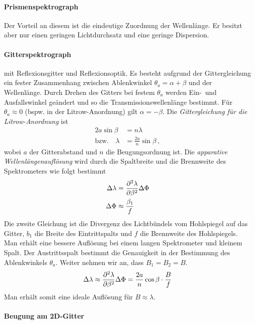 \paragraph{Prismenspektrograph}
Der Vorteil an diesem ist die eindeutige Zuordnung der Wellenlänge. 
Er besitzt aber nur einen geringen Lichtdurchsatz und eine geringe
Dispersion.

\paragraph{Gitterspektrograph}
mit Reflexionsgitter und Reflexionsoptik. 
Es besteht aufgrund der Gittergleichung ein fester Zusammenhang
zwischen Ablenkwinkel $\theta_a=\alpha+\beta$ und der Wellenlänge.
Durch Drehen des Gitters bei festem $\theta_a$
werden Ein-~und Ausfallswinkel geändert und so die
Transmissionswellenlänge bestimmt.
Für $\theta_a\approx 0$ (bspw. in der
Litrow-Anordnung) gilt $\alpha=-\beta$.
Die \emph{Gittergleichung für die Litrow-Anordnung}%
 ist
\begin{align*}
  2a\sin\beta &=n\lambda\\
  \text{bzw.}\quad \lambda &= \frac{2a}{n}\sin\beta\,,
\end{align*}
wobei $a$ der Gitterabstand und $n$ die Beugungsordnung ist. 
Die \emph{apparative Wellenlängenauflösung} wird durch die Spaltbreite
und die Brennweite des Spektrometers wie folgt bestimmt
\begin{align*}
  \Delta\lambda &=\diff[\lambda]{\beta}\Delta\Phi\\
  \Delta\Phi &\approx \frac{\beta_1}{f}
\end{align*}
Die zweite Gleichung ist die Divergenz des Lichtbündels vom
Hohlspiegel auf das Gitter, $b_1$ die Breite des Eintrittspalts und
$f$ die Brennweite des Hohlspiegels. Man erhält eine bessere Auflösung
bei einem langen Spektrometer und kleinem Spalt. Der Austrittsspalt
bestimmt die Genauigkeit in der Bestimmung des Ablenkwinkels
$\theta_a$. Weiter nehmen wir an, dass $B_1=B_2=B$.
\begin{align*}
  \Delta\lambda 
  \approx \diff[\lambda]{\beta}\Delta\Phi
  = \frac{2a}{n}\cos\beta \cdot \frac{B}{f}
\end{align*}
Man erhält somit eine ideale Auflösung für $B\approx\lambda$.

\paragraph{Beugung am 2D-Gitter}
\sFolien

